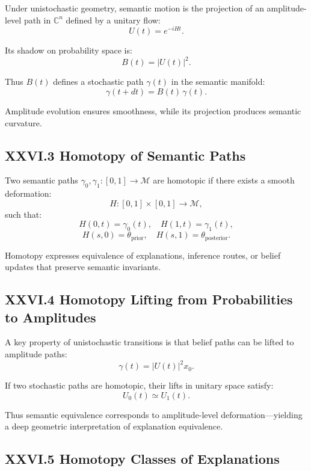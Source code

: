 \documentclass[12pt,letterpaper]{article}
\begin{document}
Under unistochastic geometry, semantic motion is the projection of an amplitude-level path in $\mathbb{C}^n$ defined by a unitary flow:
\[
U(t) = e^{-iHt}.
\]

Its shadow on probability space is:
\[
B(t) = |U(t)|^2.
\]

Thus $B(t)$ defines a stochastic path $\gamma(t)$ in the semantic manifold:
\[
\gamma(t+dt) = B(t)\, \gamma(t).
\]

Amplitude evolution ensures smoothness, while its projection produces semantic curvature.

\subsection{XXVI.3 Homotopy of Semantic Paths}

Two semantic paths $\gamma_0, \gamma_1 : [0,1]\to\mathcal{M}$ are homotopic if there exists a smooth deformation:
\[
H : [0,1]\times[0,1] \to \mathcal{M},
\]
such that:
\[
H(0,t)=\gamma_0(t), \quad H(1,t)=\gamma_1(t),
\]
\[
H(s,0)=\theta_\text{prior}, \quad H(s,1)=\theta_\text{posterior}.
\]

Homotopy expresses equivalence of explanations, inference routes, or belief updates that preserve semantic invariants.

\subsection{XXVI.4 Homotopy Lifting from Probabilities to Amplitudes}

A key property of unistochastic transitions is that belief paths can be lifted to amplitude paths:
\[
\gamma(t) = |U(t)|^2 x_0.
\]

If two stochastic paths are homotopic, their lifts in unitary space satisfy:
\[
U_0(t) \simeq U_1(t).
\]

Thus semantic equivalence corresponds to amplitude-level deformation—yielding a deep geometric interpretation of explanation equivalence.

\subsection{XXVI.5 Homotopy Classes of Explanations}
\end{document}
